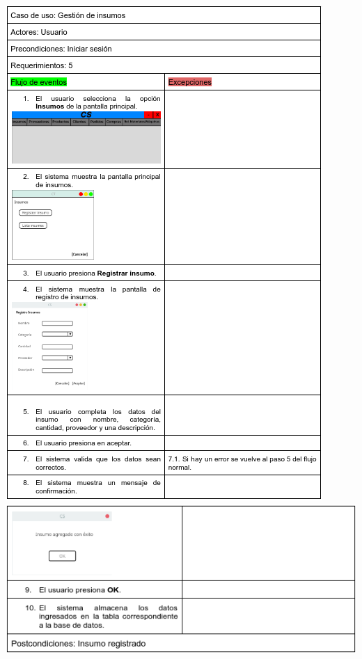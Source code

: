 \documentclass{article}
\begin{document}
	
	\includegraphics[width=1\linewidth]{imagenes/especificacion_insumos.png}
	\includegraphics[width=1\linewidth]{imagenes/especificacion_insumos2.png}
\end{document}
